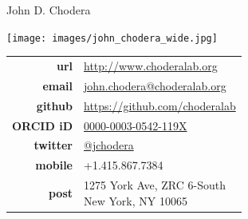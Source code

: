 \documentclass[10pt]{article}
\begin{document}
\reversemarginpar
{\selectfont \LARGE John D. Chodera}\\[1cm]

\vspace{-0.5in}

\begin{minipage}[t]{2.5in}
\texttt{[image: images/john\_chodera\_wide.jpg]}
\end{minipage}
\quad
\begin{minipage}[t]{3in}
\small
\begin{tabular}{rl}
{\bf url} & \href{http://www.choderalab.org}{http://www.choderalab.org}\\[0.05in]
{\bf email} & \href{mailto:choderaj@mskcc.org}{\href{mailto:john.chodera@choderalab.org}{john.chodera@choderalab.org}}\\[0.05in]
{\bf github} & \href{https://github.com/choderalab}{https://github.com/choderalab}\\[0.05in]
{\bf ORCID iD} & \href{http://orcid.org/0000-0003-0542-119X}{0000-0003-0542-119X}\\[0.05in]
{\bf twitter} & \href{http://twitter.com/jchodera}{@jchodera}\\[0.05in]
{\bf mobile} & +1.415.867.7384\\[0.05in]
{\bf post} & 
\parbox[t]{3.0in}{%
1275 York Ave, ZRC 6-South\\
New York, NY 10065}
\end{tabular}
\end{minipage}

\end{document}
